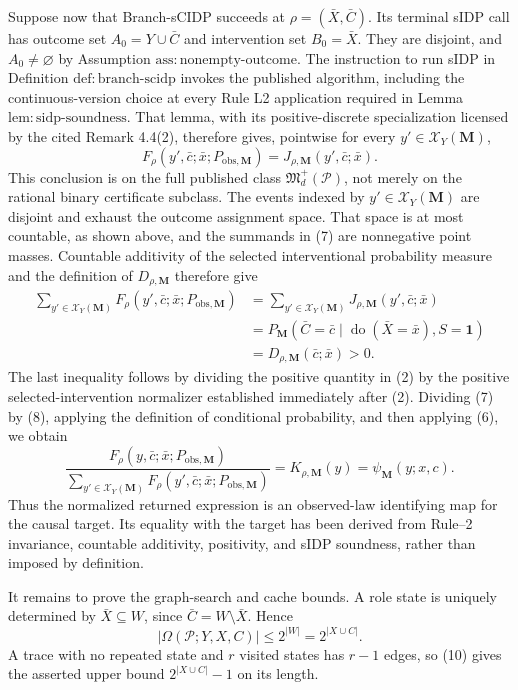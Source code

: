 Suppose now that Branch-sCIDP succeeds at \(\rho=(\bar X,\bar C)\).  Its terminal sIDP call has outcome set \(A_0=Y\cup\bar C\) and intervention set \(B_0=\bar X\).  They are disjoint, and \(A_0\neq\varnothing\) by Assumption \(\mathrm{ass{:}nonempty\text{-}outcome}\).  The instruction to run sIDP in Definition \(\mathrm{def{:}branch\text{-}scidp}\) invokes the published algorithm, including the continuous-version choice at every Rule L2 application required in Lemma \(\mathrm{lem{:}sidp\text{-}soundness}\).  That lemma, with its positive-discrete specialization licensed by the cited Remark 4.4(2), therefore gives, pointwise for every \(y'\in\mathcal X_Y(\mathbf M)\),
\[
 F_\rho(y',\bar c;\bar x;P_{\mathrm{obs},\mathbf M})
 =J_{\rho,\mathbf M}(y',\bar c;\bar x).
 \tag{7}
\]
This conclusion is on the full published class \(\mathfrak M_d^+(\mathcal P)\), not merely on the rational binary certificate subclass.  The events indexed by \(y'\in\mathcal X_Y(\mathbf M)\) are disjoint and exhaust the outcome assignment space.  That space is at most countable, as shown above, and the summands in (7) are nonnegative point masses.  Countable additivity of the selected interventional probability measure and the definition of \(D_{\rho,\mathbf M}\) therefore give
\[
\begin{aligned}
 \sum_{y'\in\mathcal X_Y(\mathbf M)}
 F_\rho(y',\bar c;\bar x;P_{\mathrm{obs},\mathbf M})
 &=\sum_{y'\in\mathcal X_Y(\mathbf M)}
 J_{\rho,\mathbf M}(y',\bar c;\bar x)\\
 &=P_{\mathbf M}\!\left(
 \bar C=\bar c\mid\operatorname{do}(\bar X=\bar x),S=\mathbf 1\right)\\
 &=D_{\rho,\mathbf M}(\bar c;\bar x)>0.
\end{aligned}
\tag{8}
\]
The last inequality follows by dividing the positive quantity in (2) by the positive selected-intervention normalizer established immediately after (2).  Dividing (7) by (8), applying the definition of conditional probability, and then applying (6), we obtain
\[
 \frac{F_\rho(y,\bar c;\bar x;P_{\mathrm{obs},\mathbf M})}
 {\sum_{y'\in\mathcal X_Y(\mathbf M)}
 F_\rho(y',\bar c;\bar x;P_{\mathrm{obs},\mathbf M})}
 =K_{\rho,\mathbf M}(y)
 =\psi_{\mathbf M}(y;x,c).
 \tag{9}
\]
Thus the normalized returned expression is an observed-law identifying map for the causal target.  Its equality with the target has been derived from Rule--2 invariance, countable additivity, positivity, and sIDP soundness, rather than imposed by definition.

It remains to prove the graph-search and cache bounds.  A role state is uniquely determined by \(\bar X\subseteq W\), since \(\bar C=W\setminus\bar X\).  Hence
\[
 |\Omega(\mathcal P;Y,X,C)|\leq 2^{|W|}=2^{|X\cup C|}.
 \tag{10}
\]
A trace with no repeated state and \(r\) visited states has \(r-1\) edges, so (10) gives the asserted upper bound \(2^{|X\cup C|}-1\) on its length.

